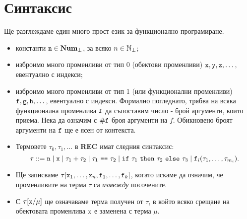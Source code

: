 \section{Синтаксис}
Ще разглеждаме един много прост език за функционално програмиране.
\begin{itemize}
\item
  константи $\texttt{n}\in\mathbf{Num}_\bot$, за всяко $n \in \mathbb{N}_\bot$;
\item
  изброимо много променливи от тип 0 (обектови променливи) $\texttt{x}, \texttt{y}, \texttt{z}, \dots$, евентуално с индекси;
\item
  изброимо много променливи от тип 1 (или функционални променливи) $\texttt{f},\texttt{g},\texttt{h},\dots$, евентуално с индекси. 
  Формално погледнато, трябва на всяка функционална променлива $\texttt{f}$
  да съпоставим число - брой аргументи, които приема. Нека да означим с $\#\texttt{f}$ броя аргументи на $f$.
  Обикновено броят аргументи на $\texttt{f}$ ще е ясен от контекста.
\item
  Термовете $\tau_0,\tau_1,\dots$ в {\bf REC} имат следния синтаксис:
  \[\tau ::= \texttt{n} \mid \texttt{x} \mid \tau_1 + \tau_2 \mid \tau_1\ \texttt{==}\ \tau_2 \mid \texttt{if}\ \tau_1\ \texttt{then}\ \tau_2\ \texttt{else}\ \tau_3 \mid \texttt{f}_i(\tau_1,\dots,\tau_{m_i}).\]
\item
  Ще записваме $\tau[\texttt{x}_1,\dots,\texttt{x}_n,\texttt{f}_1,\dots,\texttt{f}_k]$, когато искаме да означим, че променливите
  на терма $\tau$ са {\em измежду} посочените.
\item
  С $\tau[\texttt{x}/\mu]$ ще означаваме терма получен от $\tau$, в който всяко срещане на обектовата променлива $\texttt{x}$
  е заменена с терма $\mu$.
\end{itemize}



